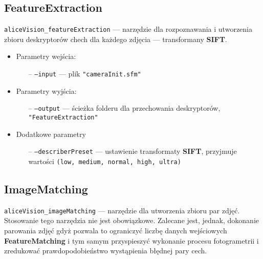 \subsection{FeatureExtraction}

\texttt{aliceVision\_featureExtraction} --- narzędzie dla rozpoznawania i utworzenia zbioru deskryptorów chech dla każdego zdjęcia --- transformany \textbf{SIFT}.

\begin{itemize}
   \item Parametry wejścia:
   \begin{itemize}
      \item[--] \texttt{--input} --- plik \texttt{"cameraInit.sfm"}
   \end{itemize}

   \item Parametry wyjścia:
   \begin{itemize}
      \item[--] \texttt{--output} --- ścieżka folderu dla przechowania deskryptorów, \texttt{"FeatureExtraction"}
   \end{itemize}

   \item Dodatkowe parametry
   \begin{itemize}
      \item[--] \texttt{--describerPreset} --- ustawienie transformaty \textbf{SIFT}, przyjmuje wartości \texttt{(low, medium, normal, high, ultra)}
   \end{itemize}
\end{itemize}

\subsection{ImageMatching}

\texttt{aliceVision\_imageMatching} --- narzędzie dla utworzenia zbioru par zdjęć.
Stosowanie tego narzędzia nie jest obowiązkowe.
Zalecane jest, jednak, dokonanie parowania zdjęć gdyż pozwala to ograniczyć liczbę danych wejściowych \textbf{FeatureMatching} i tym samym przyspieszyć wykonanie procesu fotogrametrii i zredukować prawdopodobieństwo wystąpienia błędnej pary cech.

